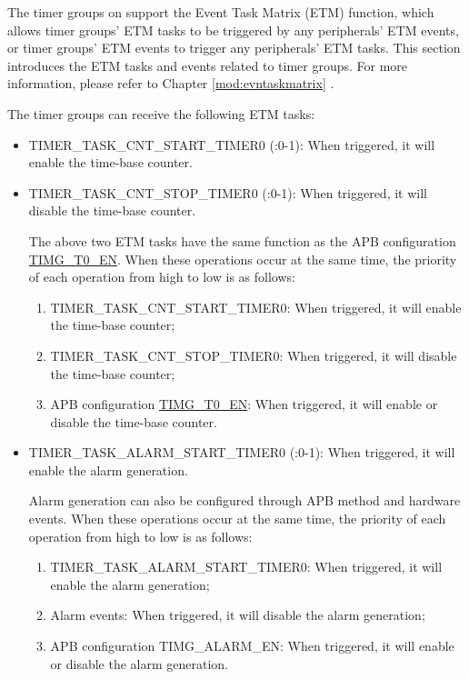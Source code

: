 \documentclass[main\_\_EN.tex]{subfiles}
\begin{document}
The timer groups on \chipname{} support the Event Task Matrix (ETM) function, which allows timer groups' ETM tasks to be triggered by any peripherals' ETM events, or timer groups' ETM events to trigger any peripherals' ETM tasks. This section introduces the ETM tasks and events related to timer groups. For more information, please refer to Chapter \ref{mod:evntaskmatrix} .

The timer groups can receive the following ETM tasks:

\begin{itemize}
    
\item TIMER\_TASK\_CNT\_START\_TIMER0 (:0-1): When triggered, it will enable the time-base counter.
\item TIMER\_TASK\_CNT\_STOP\_TIMER0 (:0-1): When triggered, it will disable the time-base counter.

\begin{tiplisting}
The above two ETM tasks have the same function as the APB configuration \hyperref[fielddesc:TIMGTXEN]{TIMG\_T0\_EN}. When these operations occur at the same time, the priority of each operation from high to low is as follows:

\begin{enumerate}
    \item TIMER\_TASK\_CNT\_START\_TIMER0: When triggered, it will enable the time-base counter;
    \item TIMER\_TASK\_CNT\_STOP\_TIMER0: When triggered, it will disable the time-base counter;
    \item APB configuration \hyperref[fielddesc:TIMGTXEN]{TIMG\_T0\_EN}: When triggered, it will enable or disable the time-base counter.
\end{enumerate}
\end{tiplisting}

\item TIMER\_TASK\_ALARM\_START\_TIMER0 (:0-1): When triggered, it will enable the alarm generation.

\begin{tiplisting}
Alarm generation can also be configured through APB method and hardware events. When these operations occur at the same time, the priority of each operation from high to low is as follows:

\begin{enumerate}
    \item TIMER\_TASK\_ALARM\_START\_TIMER0: When triggered, it will enable the alarm generation;
    \item Alarm events: When triggered, it will disable the alarm generation;
    \item APB configuration TIMG\_ALARM\_EN: When triggered, it will enable or disable the alarm generation.
\end{enumerate}
\end{tiplisting}



\end{itemize}
\end{document}
